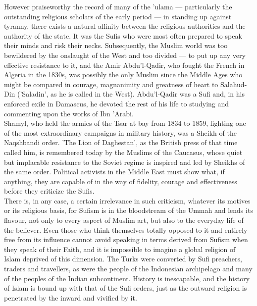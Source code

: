 \documentclass[10pt, twoside]{book}
\begin{document}
However praiseworthy the record of many of the 'ulama --- particularly the outstanding religious 
scholars of the early period --- in standing up against tyranny, there exists a natural affinity 
between the religious authorities and the authority of the state. It was the Sufis who were most 
often prepared to speak their minds and risk their necks. Subsequently, the Muslim world was too 
bewildered by the onslaught of the West and too divided --- to put up any very effective resistance to 
it, and the Amir Abdu'l\hyp{}Qadir, who fought the French in Algeria in the 1830s, was possibly the only 
Muslim since the Middle Ages who might be compared in courage, magnanimity and greatness of heart to 
Salahud\hyp{}Din ('Saladin', as he is called in the West). Abdu'l-Qadir was a Sufi and, in his enforced 
exile in Damascus, he devoted the rest of his life to studying and commenting upon the works of Ibn 
'Arabi. \\

Shamyl, who held the armies of the Tsar at bay from 1834 to 1859, fighting one of the most 
extraordinary campaigns in military history, was a Sheikh of the Naqshbandi order. 'The Lion of 
Daghestan', as the British press of that time called him, is remembered today by the Muslims of the 
Caucasus, whose quiet but implacable resistance to the Soviet regime is inspired and led by Sheikhs 
of the same order. Political activists in the Middle East must show what, if anything, they are 
capable of in the way of fidelity, courage and effectiveness before they criticize the Sufis. \\

There is, in any case, a certain irrelevance in such criticism, whatever its motives or its religious 
basis, for Sufism is in the bloodstream of the Ummah and lends its flavour, not only to every aspect 
of Muslim art, but also to the everyday life of the believer. Even those who think themselves totally 
opposed to it and entirely free from its influence cannot avoid speaking in terms derived from Sufism 
when they speak of their Faith, and it is impossible to imagine a global religion of Islam deprived 
of this dimension. The Turks were converted by Sufi preachers, traders and travellers, as were the 
people of the Indonesian archipelago and many of the peoples of the Indian subcontinent. History is 
inescapable, and the history of Islam is bound up with that of the Sufi orders, just as the outward 
religion is penetrated by the inward and vivified by it. \\
\end{document}
